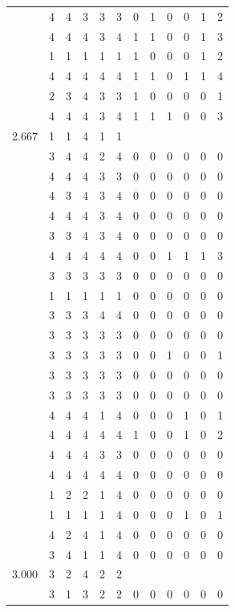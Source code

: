 \documentclass[]{book}
\theoremstyle{definition}
\theoremstyle{definition}
\theoremstyle{definition}
\theoremstyle{remark}
\begin{document}
\begin{table}
{\begin{tabular}[t]{rrrrrrrrrrrr}
 & 4 & 4 & 3 & 3 & 3 & 0 & 1 & 0 & 0 & 1 & 2\\
 & 4 & 4 & 4 & 3 & 4 & 1 & 1 & 0 & 0 & 1 & 3\\
 & 1 & 1 & 1 & 1 & 1 & 1 & 0 & 0 & 0 & 1 & 2\\
 & 4 & 4 & 4 & 4 & 4 & 1 & 1 & 0 & 1 & 1 & 4\\
 & 2 & 3 & 4 & 3 & 3 & 1 & 0 & 0 & 0 & 0 & 1\\
 & 4 & 4 & 4 & 3 & 4 & 1 & 1 & 1 & 0 & 0 & 3\\
2.667 & 1 & 1 & 4 & 1 & 1 &  &  &  &  &  & \\
 & 3 & 4 & 4 & 2 & 4 & 0 & 0 & 0 & 0 & 0 & 0\\
 & 4 & 4 & 4 & 3 & 3 & 0 & 0 & 0 & 0 & 0 & 0\\
 & 4 & 3 & 4 & 3 & 4 & 0 & 0 & 0 & 0 & 0 & 0\\
 & 4 & 4 & 4 & 3 & 4 & 0 & 0 & 0 & 0 & 0 & 0\\
 & 3 & 3 & 4 & 3 & 4 & 0 & 0 & 0 & 0 & 0 & 0\\
 & 4 & 4 & 4 & 4 & 4 & 0 & 0 & 1 & 1 & 1 & 3\\
 & 3 & 3 & 3 & 3 & 3 & 0 & 0 & 0 & 0 & 0 & 0\\
 & 1 & 1 & 1 & 1 & 1 & 0 & 0 & 0 & 0 & 0 & 0\\
 & 3 & 3 & 3 & 4 & 4 & 0 & 0 & 0 & 0 & 0 & 0\\
 & 3 & 3 & 3 & 3 & 3 & 0 & 0 & 0 & 0 & 0 & 0\\
 & 3 & 3 & 3 & 3 & 3 & 0 & 0 & 1 & 0 & 0 & 1\\
 & 3 & 3 & 3 & 3 & 3 & 0 & 0 & 0 & 0 & 0 & 0\\
 & 3 & 3 & 3 & 3 & 3 & 0 & 0 & 0 & 0 & 0 & 0\\
 & 4 & 4 & 4 & 1 & 4 & 0 & 0 & 0 & 1 & 0 & 1\\
 & 4 & 4 & 4 & 4 & 4 & 1 & 0 & 0 & 1 & 0 & 2\\
 & 4 & 4 & 4 & 3 & 3 & 0 & 0 & 0 & 0 & 0 & 0\\
 & 4 & 4 & 4 & 4 & 4 & 0 & 0 & 0 & 0 & 0 & 0\\
 & 1 & 2 & 2 & 1 & 4 & 0 & 0 & 0 & 0 & 0 & 0\\
 & 1 & 1 & 1 & 1 & 4 & 0 & 0 & 0 & 1 & 0 & 1\\
 & 4 & 2 & 4 & 1 & 4 & 0 & 0 & 0 & 0 & 0 & 0\\
 & 3 & 4 & 1 & 1 & 4 & 0 & 0 & 0 & 0 & 0 & 0\\
3.000 & 3 & 2 & 4 & 2 & 2 &  &  &  &  &  & \\
 & 3 & 1 & 3 & 2 & 2 & 0 & 0 & 0 & 0 & 0 & 0\\

\end{tabular}}
\end{table}
\end{document}
